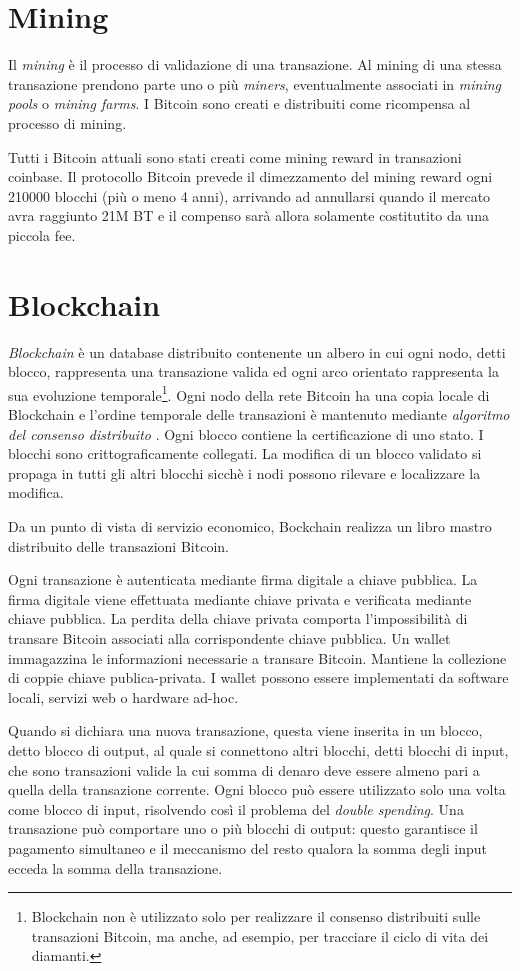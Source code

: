 \section{Mining}
Il \textit{mining} è il processo di validazione di una transazione. Al mining di una stessa transazione prendono parte uno o più \textit{miners}, eventualmente associati in \textit{mining pools} o \textit{mining farms}.
I Bitcoin sono creati e distribuiti come ricompensa al processo di mining.

Tutti i Bitcoin attuali sono stati creati come mining reward in transazioni coinbase. Il protocollo Bitcoin prevede il dimezzamento del mining reward ogni 210000 blocchi (più o meno 4 anni), arrivando ad annullarsi quando il mercato avra raggiunto 21M BT e il compenso sarà allora solamente costitutito da una piccola fee.


\section{Blockchain}
\textit{Blockchain} è un database distribuito contenente un albero in cui ogni nodo, detti blocco, rappresenta una transazione valida ed ogni arco orientato rappresenta la sua evoluzione temporale\footnote{Blockchain non è utilizzato solo per realizzare il consenso distribuiti sulle transazioni Bitcoin, ma anche, ad esempio, per tracciare il ciclo di vita dei diamanti.}.
Ogni nodo della rete Bitcoin ha una copia locale di Blockchain e l'ordine temporale delle transazioni è mantenuto mediante \textit{algoritmo del consenso distribuito}
.
Ogni blocco contiene la certificazione di uno stato. I blocchi sono crittograficamente collegati. La modifica di un blocco validato si propaga in tutti gli altri blocchi sicchè i nodi possono rilevare e localizzare la modifica.

Da un punto di vista di servizio economico, Bockchain realizza un libro mastro distribuito delle transazioni Bitcoin.

Ogni transazione è autenticata mediante firma digitale a chiave pubblica. La firma digitale viene effettuata mediante chiave privata e verificata mediante chiave pubblica. La perdita della chiave privata comporta l'impossibilità di transare Bitcoin associati alla corrispondente chiave pubblica.
Un wallet immagazzina le informazioni necessarie a transare Bitcoin. Mantiene la collezione di coppie chiave publica-privata. I wallet possono essere implementati da software locali, servizi web o hardware ad-hoc.

Quando si dichiara una nuova transazione, questa viene inserita in un blocco, detto blocco di output, al quale si connettono altri blocchi, detti blocchi di input, che sono transazioni valide la cui somma di denaro deve essere almeno pari a quella della transazione corrente.
Ogni blocco può essere utilizzato solo una volta come blocco di input, risolvendo così il problema del \textit{double spending}.
Una transazione può comportare uno o più blocchi di output: questo garantisce il pagamento simultaneo e il meccanismo del resto qualora la somma degli input ecceda la somma della transazione.

